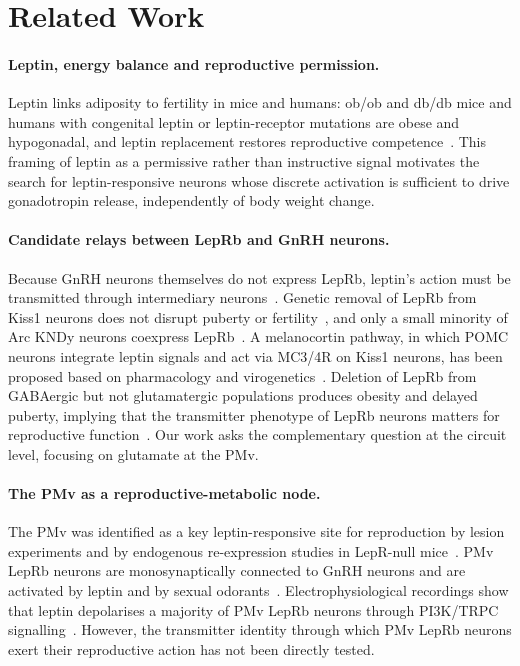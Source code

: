 \section{Related Work}

\paragraph{Leptin, energy balance and reproductive permission.} Leptin links adiposity to fertility in mice and humans: ob/ob and db/db mice and humans with congenital leptin or leptin-receptor mutations are obese and hypogonadal, and leptin replacement restores reproductive competence~\cite{ahima1997leptin,farooqi2014twenty}. This framing of leptin as a permissive rather than instructive signal motivates the search for leptin-responsive neurons whose discrete activation is sufficient to drive gonadotropin release, independently of body weight change.

\paragraph{Candidate relays between LepRb and GnRH neurons.} Because GnRH neurons themselves do not express LepRb, leptin's action must be transmitted through intermediary neurons~\cite{louis2011molecular}. Genetic removal of LepRb from Kiss1 neurons does not disrupt puberty or fertility~\cite{donato2011leptin}, and only a small minority of Arc KNDy neurons coexpress LepRb~\cite{cravo2011kiss1,true2011leptin}. A melanocortin pathway, in which POMC neurons integrate leptin signals and act via MC3/4R on Kiss1 neurons, has been proposed based on pharmacology and virogenetics~\cite{manfredilozano2016defining}. Deletion of LepRb from GABAergic but not glutamatergic populations produces obesity and delayed puberty, implying that the transmitter phenotype of LepRb neurons matters for reproductive function~\cite{martin2014leptinresponsive}. Our work asks the complementary question at the circuit level, focusing on glutamate at the PMv.

\paragraph{The PMv as a reproductive-metabolic node.} The PMv was identified as a key leptin-responsive site for reproduction by lesion experiments and by endogenous re-expression studies in LepR-null mice~\cite{donato2011leptin,mahany2018obesity}. PMv LepRb neurons are monosynaptically connected to GnRH neurons and are activated by leptin and by sexual odorants~\cite{leshan2009direct}. Electrophysiological recordings show that leptin depolarises a majority of PMv LepRb neurons through PI3K/TRPC signalling~\cite{williams2011acute}. However, the transmitter identity through which PMv LepRb neurons exert their reproductive action has not been directly tested.

